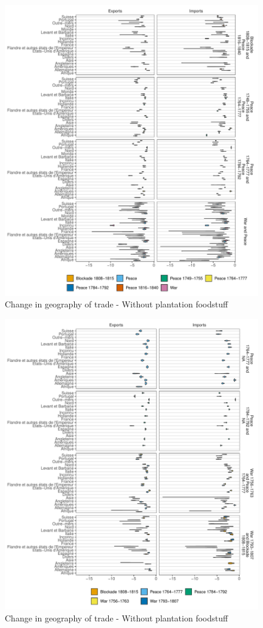 \documentclass[12pt,a4paper,notitlepage,english]{article}
\begin{document}
\begin{appendix}
\begin{figure}[h!]
\caption{Change in geography of trade - Without plantation foodstuff}
\label{fig:violin_nat_pays0_XI1}
\includegraphics[scale=.9]{violin_nat_pays0_XI1}
\end{figure}
\begin{figure}[h!]
\caption{Change in geography of trade - Without plantation foodstuff}
\label{fig:violin_nat_pays0_XI2}
\includegraphics[scale=.9]{violin_nat_pays0_XI2}
\end{figure}


\end{appendix}
\end{document}
